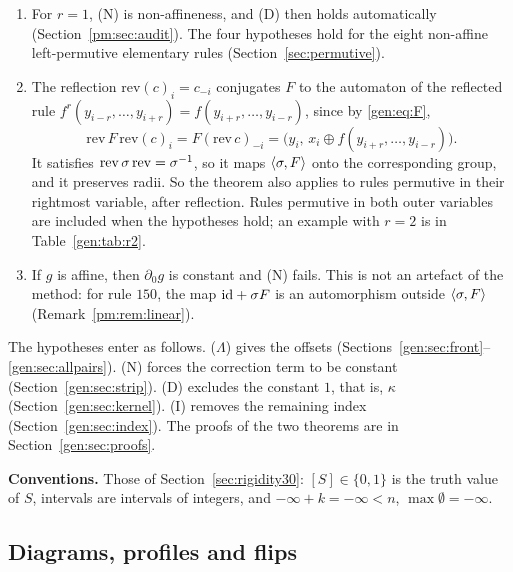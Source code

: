 \begin{remark}[scope]\label{gen:rem:scope}
\begin{enumerate}
\item For $r=1$, (N) is non-affineness, and (D) then holds automatically (Section~\ref{pm:sec:audit}). The four hypotheses hold for the eight non-affine left-permutive elementary rules (Section~\ref{sec:permutive}).
\item The reflection $\mathrm{rev}(c)_i=c_{-i}$ conjugates $F$ to the automaton of the reflected rule $f^r(y_{i-r},\dots,y_{i+r})=f(y_{i+r},\dots,y_{i-r})$, since by \eqref{gen:eq:F},
\[
\mathrm{rev}\,F\,\mathrm{rev}(c)_i=F(\mathrm{rev}\,c)_{-i}=\bigl(y_i,\,x_i\oplus f(y_{i+r},\dots,y_{i-r})\bigr).
\]
It satisfies $\mathrm{rev}\,\sigma\,\mathrm{rev}=\sigma^{-1}$, so it maps $\langle\sigma,F\rangle$ onto the corresponding group, and it preserves radii. So the theorem also applies to rules permutive in their rightmost variable, after reflection. Rules permutive in both outer variables are included when the hypotheses hold; an example with $r=2$ is in Table~\ref{gen:tab:r2}.
\item If $g$ is affine, then $\partial_0g$ is constant and (N) fails. This is not an artefact of the method: for rule $150$, the map $\mathrm{id}+\sigma F$ is an automorphism outside $\langle\sigma,F\rangle$ (Remark~\ref{pm:rem:linear}).
\end{enumerate}
\end{remark}

The hypotheses enter as follows. ($\Lambda$) gives the offsets (Sections~\ref{gen:sec:front}--\ref{gen:sec:allpairs}). (N) forces the correction term to be constant (Section~\ref{gen:sec:strip}). (D) excludes the constant $1$, that is, $\kappa$ (Section~\ref{gen:sec:kernel}). (I) removes the remaining index (Section~\ref{gen:sec:index}). The proofs of the two theorems are in Section~\ref{gen:sec:proofs}.

\medskip
\noindent\textbf{Conventions.} Those of Section~\ref{sec:rigidity30}: $[S]\in\{0,1\}$ is the truth value of $S$, intervals are intervals of integers, and $-\infty+k=-\infty<n$, $\max\emptyset=-\infty$.

\subsection{Diagrams, profiles and flips}\label{gen:sec:profiles}

